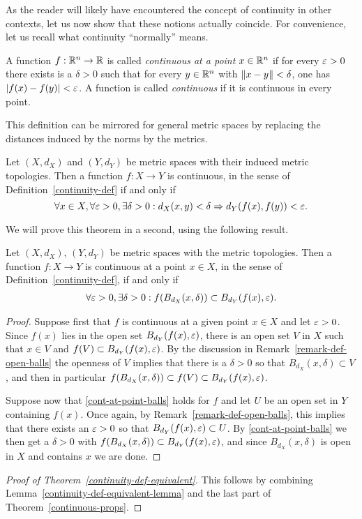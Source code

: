 As the reader will likely have encountered the concept of continuity in other contexts, let us now show that these notions actually coincide. For convenience, let us recall what continuity ``normally'' means.

\begin{defn}
  A function $f : \mathbb{R}^n \to \mathbb{R}$ is called \emph{continuous at a point} $x \in \mathbb{R}^n$ if for every $\varepsilon > 0$ there exists is a $\delta > 0$ such that for every $y \in \mathbb{R}^n$ with $\lVert x-y \rVert < \delta$, one has $\lvert f(x)-f(y) \rvert < \varepsilon$. A function is called \emph{continuous} if it is continuous in every point.
\end{defn}
This definition can be mirrored for general metric spaces by replacing the distances induced by the norms by the metrics.
\begin{thm}
  \label{continuity-def-equivalent}
  Let $(X,d_X)$ and $(Y,d_Y)$ be metric spaces with their induced metric topologies. Then a function $f : X \to Y$ is continuous, in the sense of Definition~\ref{continuity-def} if and only if
  \[
    \forall x \in X, \forall \varepsilon > 0, \exists \delta > 0 : d_X(x,y) < \delta \Rightarrow d_Y(f(x),f(y)) < \varepsilon.
  \]
\end{thm}
We will prove this theorem in a second, using the following result.
\begin{lem}
  \label{continuity-def-equivalent-lemma}
  Let $(X,d_X)$, $(Y,d_Y)$ be metric spaces with the metric topologies. Then a function $f : X \to Y$ is continuous at a point $x \in X$, in the sense of Definition~\ref{continuity-def}, if and only if
  \begin{align}
    \label{cont-at-point-balls}
    \forall \varepsilon > 0, \exists \delta > 0 : f(B_{d_X}(x,\delta)) \subset B_{d_Y}(f(x),\varepsilon).
  \end{align}
\end{lem}
\begin{proof}
  Suppose first that $f$ is continuous at a given point $x \in X$ and let $\varepsilon > 0$. Since $f(x)$ lies in the open set $B_{d_Y}(f(x),\varepsilon)$, there is an open set $V$ in $X$ such that $x \in V$ and $f(V) \subset B_{d_Y}(f(x),\varepsilon)$. By the discussion in Remark~\ref{remark-def-open-balls} the openness of $V$ implies that there is a $\delta > 0$ so that $B_{d_X}(x,\delta) \subset V$, and then in particular $f(B_{d_X}(x,\delta)) \subset f(V) \subset B_{d_Y}(f(x),\varepsilon)$.
  
  Suppose now that \eqref{cont-at-point-balls} holds for $f$ and let $U$ be an open set in $Y$ containing $f(x)$. Once again, by Remark~\ref{remark-def-open-balls}, this implies that there exists an $\varepsilon > 0$ so that $B_{d_Y}(f(x),\varepsilon) \subset U$. By \eqref{cont-at-point-balls} we then get a $\delta > 0$ with $f(B_{d_X}(x,\delta)) \subset B_{d_Y}(f(x),\varepsilon)$, and since $B_{d_X}(x,\delta)$ is open in $X$ and contains $x$ we are done.
\end{proof}
\begin{proof}[Proof of Theorem~\ref{continuity-def-equivalent}]
  This follows by combining Lemma~\ref{continuity-def-equivalent-lemma} and the last part of Theorem~\ref{continuous-props}.
\end{proof}

